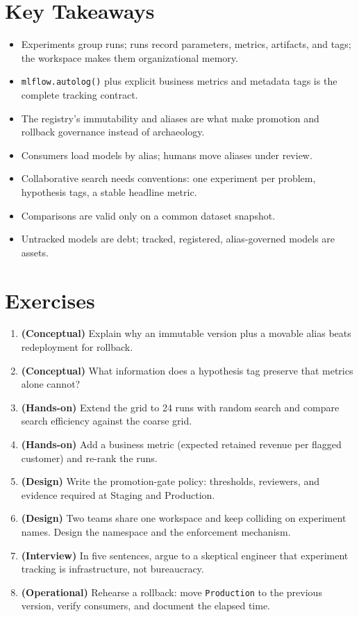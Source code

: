 \section*{Key Takeaways}
\begin{itemize}
    \item Experiments group runs; runs record parameters, metrics, artifacts, and tags; the workspace makes them organizational memory.
    \item \texttt{mlflow.autolog()} plus explicit business metrics and metadata tags is the complete tracking contract.
    \item The registry's immutability and aliases are what make promotion and rollback governance instead of archaeology.
    \item Consumers load models by alias; humans move aliases under review.
    \item Collaborative search needs conventions: one experiment per problem, hypothesis tags, a stable headline metric.
    \item Comparisons are valid only on a common dataset snapshot.
    \item Untracked models are debt; tracked, registered, alias-governed models are assets.
\end{itemize}

\section{Exercises}
\begin{enumerate}
    \item \textbf{(Conceptual)} Explain why an immutable version plus a movable alias beats redeployment for rollback.
    \item \textbf{(Conceptual)} What information does a hypothesis tag preserve that metrics alone cannot?
    \item \textbf{(Hands-on)} Extend the grid to 24 runs with random search and compare search efficiency against the coarse grid.
    \item \textbf{(Hands-on)} Add a business metric (expected retained revenue per flagged customer) and re-rank the runs.
    \item \textbf{(Design)} Write the promotion-gate policy: thresholds, reviewers, and evidence required at Staging and Production.
    \item \textbf{(Design)} Two teams share one workspace and keep colliding on experiment names. Design the namespace and the enforcement mechanism.
    \item \textbf{(Interview)} In five sentences, argue to a skeptical engineer that experiment tracking is infrastructure, not bureaucracy.
    \item \textbf{(Operational)} Rehearse a rollback: move \texttt{Production} to the previous version, verify consumers, and document the elapsed time.
\end{enumerate}

